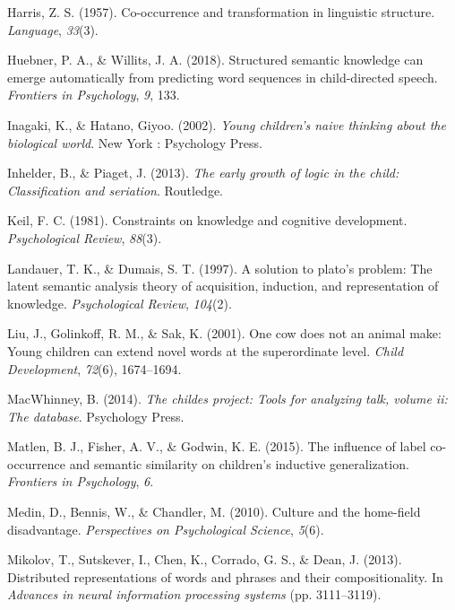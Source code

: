\documentclass[english,,man,floatsintext]{apa6}
\begin{document}
\leavevmode\hypertarget{ref-harris1957}{}%
Harris, Z. S. (1957). Co-occurrence and transformation in linguistic structure. \emph{Language}, \emph{33}(3).

\leavevmode\hypertarget{ref-huebner2018}{}%
Huebner, P. A., \& Willits, J. A. (2018). Structured semantic knowledge can emerge automatically from predicting word sequences in child-directed speech. \emph{Frontiers in Psychology}, \emph{9}, 133.

\leavevmode\hypertarget{ref-inagaki2002}{}%
Inagaki, K., \& Hatano, Giyoo. (2002). \emph{Young children's naive thinking about the biological world}. New York : Psychology Press.

\leavevmode\hypertarget{ref-inhelder2013}{}%
Inhelder, B., \& Piaget, J. (2013). \emph{The early growth of logic in the child: Classification and seriation}. Routledge.

\leavevmode\hypertarget{ref-keil1981}{}%
Keil, F. C. (1981). Constraints on knowledge and cognitive development. \emph{Psychological Review}, \emph{88}(3).

\leavevmode\hypertarget{ref-landauer1997}{}%
Landauer, T. K., \& Dumais, S. T. (1997). A solution to plato's problem: The latent semantic analysis theory of acquisition, induction, and representation of knowledge. \emph{Psychological Review}, \emph{104}(2).

\leavevmode\hypertarget{ref-liu2001}{}%
Liu, J., Golinkoff, R. M., \& Sak, K. (2001). One cow does not an animal make: Young children can extend novel words at the superordinate level. \emph{Child Development}, \emph{72}(6), 1674--1694.

\leavevmode\hypertarget{ref-macwhinney2014}{}%
MacWhinney, B. (2014). \emph{The childes project: Tools for analyzing talk, volume ii: The database}. Psychology Press.

\leavevmode\hypertarget{ref-matlen2015}{}%
Matlen, B. J., Fisher, A. V., \& Godwin, K. E. (2015). The influence of label co-occurrence and semantic similarity on children's inductive generalization. \emph{Frontiers in Psychology}, \emph{6}.

\leavevmode\hypertarget{ref-medin2010}{}%
Medin, D., Bennis, W., \& Chandler, M. (2010). Culture and the home-field disadvantage. \emph{Perspectives on Psychological Science}, \emph{5}(6).

\leavevmode\hypertarget{ref-mikolov2013}{}%
Mikolov, T., Sutskever, I., Chen, K., Corrado, G. S., \& Dean, J. (2013). Distributed representations of words and phrases and their compositionality. In \emph{Advances in neural information processing systems} (pp. 3111--3119).
\end{document}
